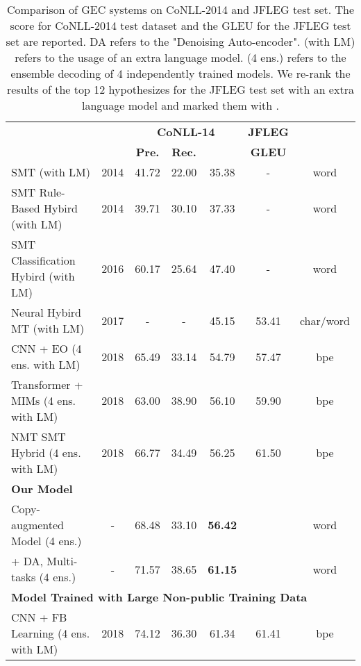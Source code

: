 \documentclass[11pt,a4paper]{article}
\begin{document}
\begin{table*}[t!]
\begin{center}
\begin{tabular}{|l|c|ccc|c|c|}
\hline 
\bf \multirow{2}{*}{Model} & \bf \multirow{2}{*}{Year} & \multicolumn{3}{|c|}{\bf CoNLL-14} & \bf JFLEG & \bf \multirow{2}{*}{Dict} \\
\bf & \bf & \bf Pre. & \bf Rec. & \bf  & \bf GLEU & \bf  \\ \hline
SMT (with LM) & 2014 & 41.72 & 22.00 & 35.38 & - & word \\
SMT Rule-Based Hybird (with LM) & 2014 & 39.71 & 30.10 & 37.33 & - & word \\
SMT Classification Hybird (with LM) & 2016 & 60.17 & 25.64 & 47.40 & - & word \\
Neural Hybird MT (with LM) & 2017 & - & - & 45.15 & 53.41 & char/word \\
CNN + EO (4 ens. with LM) & 2018 & 65.49 & 33.14 & 54.79 & 57.47 & bpe \\
Transformer + MIMs (4 ens. with LM) & 2018 & 63.00 & 38.90 & 56.10 & 59.90 & bpe \\
NMT SMT Hybrid (4 ens. with LM) & 2018 & 66.77 & 34.49 & 56.25 & 61.50 & bpe \\

\hline 
\multicolumn{7}{|l|}{\bf Our Model} \\
\hline
Copy-augmented Model (4 ens.) & - & 68.48 & 33.10 & \bf 56.42 &  & word \\
+ DA, Multi-tasks (4 ens.) & - & 71.57 & 38.65 & \bf 61.15 &  & word \\

\hline
\multicolumn{7}{|l|}{\bf Model Trained with Large Non-public Training Data} \\
\hline
CNN + FB Learning (4 ens. with LM) & 2018 & 74.12 & 36.30 & 61.34 & 61.41 & bpe \\

\hline
\end{tabular}
\end{center}
\caption{\label{comparison} Comparison of GEC systems on CoNLL-2014 and JFLEG test set. The  score for CoNLL-2014 test dataset and the GLEU for the JFLEG test set are reported. DA refers to the "Denoising Auto-encoder". (with LM) refers to the usage of an extra language model. (4 ens.) refers to the ensemble decoding of 4 independently trained models. We re-rank the results of the top 12 hypothesizes for the JFLEG test set with an extra language model and marked them with .}
\end{table*}
\end{document}
